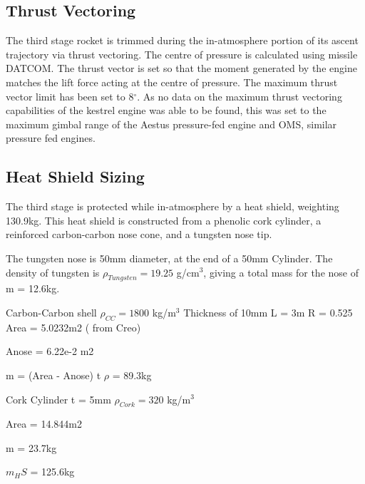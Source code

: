 		\subsection{Thrust Vectoring}
		
		The third stage rocket is trimmed during the in-atmosphere portion of its ascent trajectory via thrust vectoring. The centre of pressure is calculated using missile DATCOM. The thrust vector is set so that the moment generated by the engine matches the lift force acting at the centre of pressure. The maximum thrust vector limit has been set to 8$^\circ$. As no data on the maximum thrust vectoring capabilities of the kestrel engine was able to be found, this was set to the maximum gimbal range of the Aestus pressure-fed engine and OMS, similar pressure fed engines. 
		
		
		\subsection{Heat Shield Sizing}
		
			The third stage is protected while in-atmosphere by a heat shield, weighting 130.9kg. This heat shield is constructed from a phenolic cork cylinder, a reinforced carbon-carbon nose cone, and a tungsten nose tip. 
		
		
		The tungsten nose is 50mm diameter, at the end of a 50mm Cylinder. The density of tungsten is $\rho_{Tungsten} = 19.25$  g/cm$^3$, giving a total mass for the nose of m = 12.6kg.
		
		Carbon-Carbon shell
		$\rho_{CC} = 1800$  kg/m$^3$
		Thickness of 10mm
		L = 3m
		R = 0.525
		Area = 5.0232m2 ( from Creo)
		
		Anose = 6.22e-2 m2
		
		m = (Area - Anose) t $\rho$ = 89.3kg
		
		
		Cork Cylinder
		t = 5mm
		$\rho_{Cork} = 320$  kg/m$^3$
		
		Area = 14.844m2
		
		m = 23.7kg
		
		
		$m_HS$ = 125.6kg
		